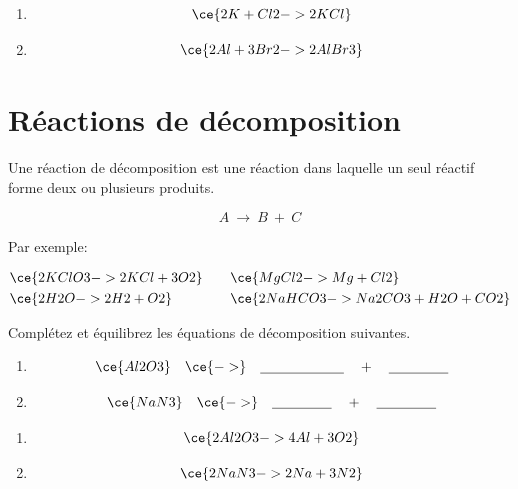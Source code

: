\documentclass[
  11pt,
  a4paper,
  openany]{book}
\begin{document}
\begin{Answer}

\begin{enumerate}
\def\labelenumi{\arabic{enumi}.}
\item
  \[\ce{2K + Cl2 -> 2KCl }\]
\item
  \[\ce{2 Al + 3 Br2 -> 2 AlBr3 }\]
\end{enumerate}

\end{Answer}

\hypertarget{ruxe9actions-de-duxe9composition}{%
\section{Réactions de décomposition}\label{ruxe9actions-de-duxe9composition}}

Une réaction de décomposition est une réaction dans laquelle un seul réactif forme deux ou plusieurs produits.

\[ A\ \longrightarrow\ B\ +\ C \]

Par exemple:

\[ \begin{split}
  & \ce{2KClO3 -> 2KCl + 3O2} \\
  & \ce{2H2O -> 2H2 + O2}
  \end{split}
  \qquad
  \begin{split}
  & \ce{MgCl2 -> Mg + Cl2} \\
  & \ce{2NaHCO3 -> Na2CO3 + H2O + CO2}
  \end{split} \]

\begin{Exercise}

Complétez et équilibrez les équations de décomposition suivantes.

\begin{enumerate}
\def\labelenumi{\arabic{enumi}.}
\item
  \[\ce{Al2O3} \quad \ce{->} \quad \underline{\hspace{6em}} \quad + \quad \underline{\hspace{1.5cm}}\]
\item
  \[\ce{NaN3} \quad \ce{->} \quad \underline{\hspace{1.5cm}} \quad + \quad \underline{\hspace{1.5cm}}\]
\end{enumerate}

\end{Exercise}

\begin{Answer}

\begin{enumerate}
\def\labelenumi{\arabic{enumi}.}
\item
  \[\ce{2 Al2O3 -> 4 Al + 3 O2}\]
\item
  \[\ce{2 NaN3 -> 2 Na + 3 N2}\]
\end{enumerate}

\end{Answer}
\end{document}

